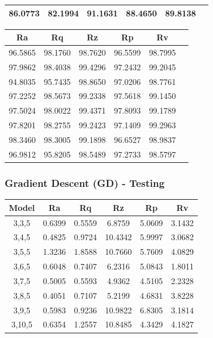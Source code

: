 \documentclass[suppldata]{interact}
\begin{document}
\begin{landscape}
\begin{minipage}{0.30\textwidth}
\begin{tabular}{|c|c|c|c|c|c|}
        86.0773 & 82.1994 & 91.1631 & 88.4650 & 89.8138 \\ \hline
    \end{tabular}
        \label{tab:gdmapetr}
    \end{minipage}
    \hfill 
\begin{minipage}{0.40\textwidth}
\small
\centering
    \begin{tabular}{|c|c|c|c|c|c|}
    \hline
        Ra &  Rq &  Rz &  Rp & Rv \\ \hline
        96.5865 & 98.1760 & 98.7620 & 96.5599 & 98.7995 \\ \hline
        97.9862 & 98.4038 & 99.4296 & 97.2432 & 99.2045 \\ \hline
        94.8035 & 95.7435 & 98.8650 & 97.0206 & 98.7761 \\ \hline
        97.2252 & 98.5673 & 99.2338 & 97.5618 & 99.1450 \\ \hline
        97.5024 & 98.0022 & 99.4371 & 97.8093 & 99.1789 \\ \hline
        97.8201 & 98.2755 & 99.2423 & 97.1409 & 99.2963 \\ \hline
        98.3460 & 98.3005 & 99.1898 & 96.6527 & 98.9837 \\ \hline
        96.9812 & 95.8205 & 98.5489 & 97.2733 & 98.5797 \\ \hline

    \end{tabular}
        \label{tab:gdr2tr}
    \end{minipage}
    \hfill 
\subsubsection{ Gradient Descent  (GD) - Testing}
   \begin{minipage}{0.35\textwidth}
   \small
 \centering
    \begin{tabular}{|c|c|c|c|c|c|}
    \hline
              Model &  Ra &  Rq &  Rz &  Rp & Rv \\ \hline
                3,3,5 & 0.6399 & 0.5559 & 6.8759 & 5.0609 & 3.1432 \\ \hline
                3,4,5 & 0.4825 & 0.9724 & 10.4342 & 5.9997 & 3.0682 \\ \hline
                3,5,5 & 1.3236 & 1.8588 & 10.7660 & 5.7609 & 4.0829 \\ \hline
                3,6,5 & 0.6048 & 0.7407 & 6.2316 & 5.0843 & 1.8011 \\ \hline
                3,7,5 & 0.5005 & 0.5593 & 4.9362 & 4.5105 & 2.2328 \\ \hline
                3,8,5 & 0.4051 & 0.7107 & 5.2199 & 4.6831 & 3.8228 \\ \hline
                3,9,5 & 0.5983 & 0.9236 & 10.9822 & 6.8305 & 3.1814 \\ \hline
                3,10,5 & 0.6354 & 1.2557 & 10.8485 & 4.3429 & 4.1827 \\ \hline


\end{tabular}
\end{minipage}
\end{landscape}
\end{document}
